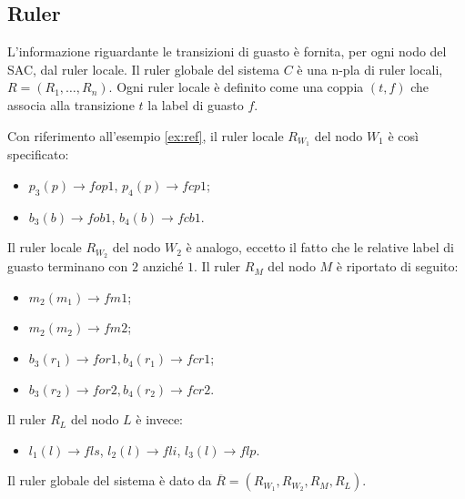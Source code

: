\subsection{Ruler}
L'informazione riguardante le transizioni di guasto è fornita, per ogni nodo del SAC, dal ruler locale. Il ruler globale del sistema $C$ è una n-pla di ruler locali, $R = (R_1, \ldots, R_n)$. Ogni ruler locale è definito come una coppia $(t,f)$ che associa alla transizione $t$ la label di guasto $f$.

\begin{ex} \label{ex:ruler}
Con riferimento all'esempio \ref{ex:ref}, il ruler locale $R_{W_1}$ del nodo $W_1$ è così specificato:
\begin{itemize}
\item $p_3(p) \rightarrow fop1$, $p_4(p) \rightarrow fcp1$;
\item $b_3(b) \rightarrow fob1$, $b_4(b) \rightarrow fcb1$.
\end{itemize}
Il ruler locale $R_{W_2}$ del nodo $W_2$ è analogo, eccetto il fatto che le relative label di guasto terminano con $2$ anziché $1$.
Il ruler $R_M$ del nodo $M$ è riportato di seguito:
\begin{itemize}
\item $m_2(m_1) \rightarrow fm1$;
\item $m_2(m_2) \rightarrow fm2$;
\item $b_3(r_1) \rightarrow for1, b_4(r_1) \rightarrow fcr1$;
\item $b_3(r_2) \rightarrow for2, b_4(r_2) \rightarrow fcr2$.
\end{itemize}
Il ruler $R_L$ del nodo $L$ è invece:
\begin{itemize}
\item $l_1(l) \rightarrow fls$, $l_2(l) \rightarrow fli$, $l_3(l) \rightarrow flp$.
\end{itemize}
Il ruler globale del sistema è dato da $\overline{R} = (R_{W_1},R_{W_2},R_M,R_L)$.
\end{ex}

